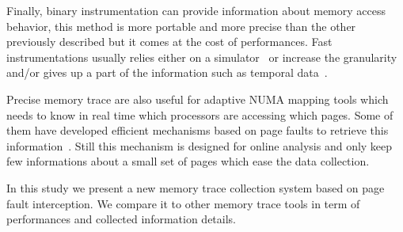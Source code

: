 Finally, binary instrumentation can provide information about memory access
behavior, this method is more portable and  more precise than the other
previously described but it comes at the cost of performances. Fast
instrumentations usually relies either on a simulator~\cite{DeRose02SIGMA} or
increase the granularity and/or gives up a part of the information such as
temporal data~\cite{Beniamine15TABARNACRR}.

Precise memory trace are also useful for adaptive NUMA mapping tools which
needs to know in real time which processors are accessing which pages. Some of
them have developed efficient mechanisms based on page faults to retrieve this
information~\cite{Diener13CommunicationBased}. Still this mechanism is
designed for online analysis and only keep few informations about a small set
of pages which ease the data collection.

In this study we present a new memory trace collection system based on page
fault interception. We compare it to other memory trace tools in term of
performances and collected information details.
